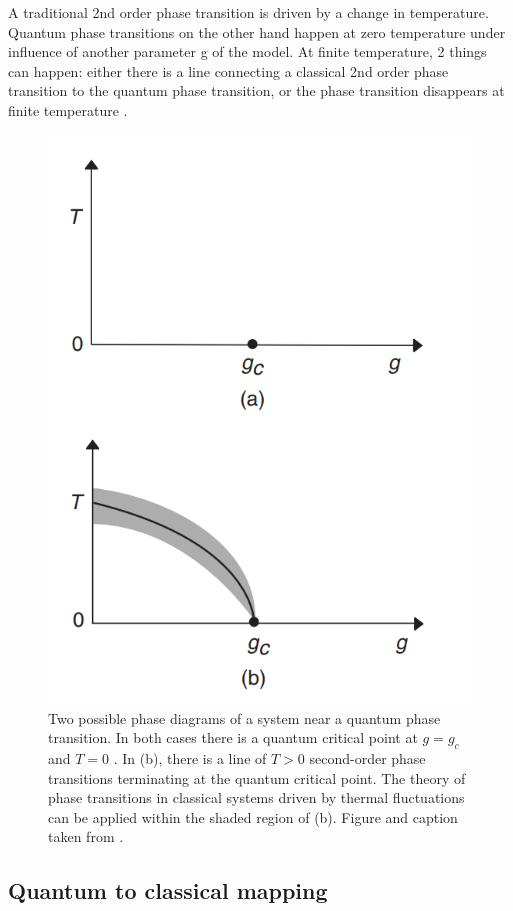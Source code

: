 A traditional 2nd order phase transition is driven by a change in temperature. Quantum phase transitions on the other hand happen at zero temperature under influence of another parameter g of the model. At finite temperature, 2 things can happen: either there is a line connecting a classical 2nd order phase transition to the quantum phase transition, or the phase transition disappears at finite temperature \cite{Sachdev1999}.

\begin{figure}[H]
    \center
    \includegraphics[width=\textwidth]{Figuren/crit/Screenshot from 2021-05-06 15-58-55.png}
    \caption{ Two possible phase diagrams of a system near a quantum phase transition. In both cases there is a quantum critical point at $g = g_c$ and $T = 0$ . In (b), there is a line of $T > 0$ second-order phase transitions terminating at the quantum critical point. The theory of phase transitions in classical systems driven by thermal fluctuations can be applied within the shaded region of (b).  Figure and caption taken from \cite{Sachdev1999}. }
    \label{fig:crit:qtran}
\end{figure}

\subsection{Quantum to classical mapping}

